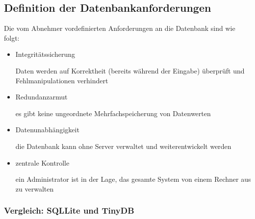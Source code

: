 \documentclass[a4paper,oneside,12pt]{report}
\begin{document}
			\subsection{Definition der Datenbankanforderungen}
			
				Die vom Abnehmer vordefinierten Anforderungen an die Datenbank sind wie folgt:
				\begin{itemize}
					\item Integritätssicherung\\
					\begin{small}
						Daten werden auf Korrektheit (bereits während der Eingabe) überprüft und Fehlmanipulationen  verhindert 
					\end{small}
					
					\item Redundanzarmut\\
					\begin{small}
						es gibt keine ungeordnete Mehrfachspeicherung von Datenwerten
					\end{small}
								
					\item Datenunabhängigkeit\\
					\begin{small}
						die Datenbank kann ohne Server verwaltet und weiterentwickelt werden
					\end{small} 
					
					\item zentrale Kontrolle\\
					\begin{small}
						ein Administrator ist in der Lage, das gesamte System von einem Rechner aus zu verwalten
					\end{small}
				\end{itemize}
				
				
				\subsubsection{Vergleich: SQLLite und TinyDB}
				
\end{document}
